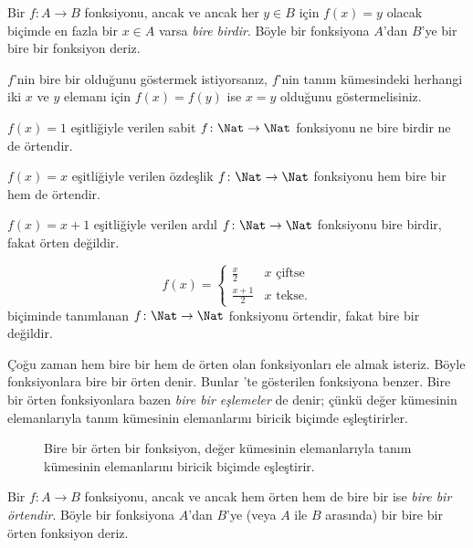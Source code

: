 \documentclass[../../../include/open-logic-section]{subfiles}
\begin{document}
\begin{defn}
Bir $f \colon A \rightarrow B$ fonksiyonu, ancak ve ancak her $y \in B$ için
$f(x)=y$ olacak biçimde en fazla bir $x \in A$ varsa \emph{bire birdir}.
Böyle bir fonksiyona $A$'dan $B$'ye bir bire bir fonksiyon deriz.
\end{defn}

\begin{explain}
$f$'nin bire bir olduğunu göstermek istiyorsanız, $f$'nin tanım kümesindeki
herhangi iki $x$ ve $y$ elemanı için $f(x)=f(y)$ ise $x=y$ olduğunu
göstermelisiniz.
\end{explain}

\begin{ex}
$f(x)=1$ eşitliğiyle verilen sabit $f\colon \Nat \to \Nat$ fonksiyonu ne
bire birdir ne de örtendir.

$f(x)=x$ eşitliğiyle verilen özdeşlik $f\colon \Nat \to \Nat$ fonksiyonu hem
bire bir hem de örtendir.

$f(x)=x+1$ eşitliğiyle verilen ardıl $f \colon \Nat \to \Nat$ fonksiyonu
bire birdir, fakat örten değildir.

\[
  f(x) =
  \begin{cases}
    \frac{x}{2} & \text{$x$ çiftse} \\
    \frac{x+1}{2} & \text{$x$ tekse.}
  \end{cases}
\]
biçiminde tanımlanan $f \colon \Nat \to \Nat$ fonksiyonu örtendir, fakat
bire bir değildir.
\end{ex}

\begin{explain}
Çoğu zaman hem bire bir hem de örten olan fonksiyonları ele almak isteriz.
Böyle fonksiyonlara bire bir örten denir. Bunlar
'te gösterilen fonksiyona benzer. Bire bir örten
fonksiyonlara bazen \emph{bire bir eşlemeler} de denir; çünkü değer kümesinin
elemanlarıyla tanım kümesinin elemanlarını biricik biçimde eşleştirirler.
\begin{figure}
  \caption{Bire bir örten bir fonksiyon, değer kümesinin elemanlarıyla tanım
    kümesinin elemanlarını biricik biçimde eşleştirir.}
\end{figure}
\end{explain}

\begin{defn}
Bir $f \colon A \to B$ fonksiyonu, ancak ve ancak hem örten hem de bire bir ise
\emph{bire bir örtendir}. Böyle bir fonksiyona $A$'dan $B$'ye (veya $A$ ile
$B$ arasında) bir bire bir örten fonksiyon deriz.
\end{defn}
\end{document}
